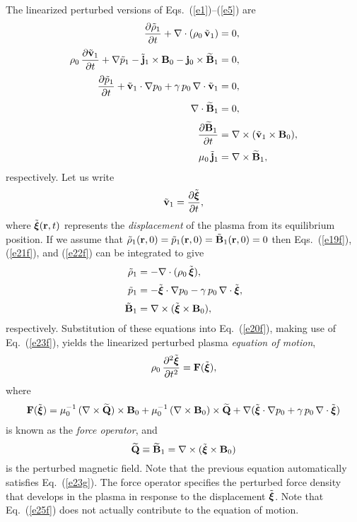 \documentclass[12pt,prb,aps,notitlepage]{revtex4-1}
\newcommand{\bxi}{\mbox{\boldmath$\xi$}}
\begin{document}
The linearized perturbed versions of  Eqs.~(\ref{e1})--(\ref{e5}) are
\begin{align}
\frac{\partial\tilde{\rho}_1}{\partial t} + \nabla\cdot(\rho_0\,\tilde{\bf v}_1) & =0,\label{e19f}\\[0.5ex]
\rho_0\,\frac{\partial\tilde{\bf v}_1}{\partial t} +\nabla \tilde{p}_1 - \tilde{\bf j}_1\times {\bf B}_0-{\bf j}_0\times \widetilde{\bf B}_1&=0,\label{e20f}\\[0.5ex]
\frac{\partial \tilde{p}_1}{\partial t}+\tilde{\bf v}_1\cdot\nabla p_0 + \gamma\,p_0\,\nabla\cdot\tilde{\bf v}_1 &=0,\label{e21f}\\[0.5ex]
\nabla\cdot\widetilde{\bf B}_1&=0,\label{e23g}\\[0.5ex]
\frac{\partial \widetilde{\bf B}_1}{\partial t} &= \nabla\times(\tilde{\bf v}_1\times {\bf B}_0),\label{e22f}\\[0.5ex]
\mu_0\,\tilde{\bf j}_1 &= \nabla\times \widetilde{\bf B}_1,\label{e23f}
\end{align}
respectively. 
Let us write
\begin{equation}\label{e15x}
\tilde{\bf v}_1 = \frac{\partial\tilde{\bxi}}{\partial t},
\end{equation}
where $\tilde{\bxi}({\bf r},t)$ represents the {\em displacement}\/ of the plasma from its equilibrium position. If
we assume that $\tilde{\rho}_1({\bf r},0)= \tilde{p}_1({\bf r},0)=\tilde{\bf B}_1({\bf r},0) = 0$ then Eqs.~(\ref{e19f}), (\ref{e21f}),
and (\ref{e22f}) can be integrated to give
\begin{align}
\tilde{\rho}_1&= -\nabla\cdot(\rho_0\,\tilde{\bxi}),\label{e25f}\\[0.5ex]
\tilde{p}_1&= -\tilde{\bxi}\cdot\nabla p_0 -\gamma\,p_0\,\nabla\cdot\tilde{\bxi},\label{e26f}\\[0.5ex]
\tilde{\bf B}_1&= \nabla\times (\tilde{\bxi}\times {\bf B}_0),
\end{align}
respectively. 
Substitution of these equations into Eq.~(\ref{e20f}), making use of Eq.~(\ref{e23f}),  yields the linearized perturbed plasma {\em equation of motion},
\begin{equation}\label{e28f}
\rho_0\,\frac{\partial^2\tilde{\bxi}}{\partial t^2} = {\bf F}(\tilde{\bxi}),
\end{equation}
where 
\begin{align}
{\bf F}(\tilde{\bxi}) = \mu_0^{-1}\,(\nabla\times \widetilde{\bf Q})\times{\bf B}_0+ \mu_0^{-1}\, (\nabla\times {\bf B}_0)\times \widetilde{\bf Q} + 
\nabla(\tilde{\bxi}\cdot \nabla p_0 + \gamma\,p_0\,\nabla\cdot\tilde{\bxi})
\end{align}
is known as the {\em force operator}, 
and
\begin{equation}
\widetilde{\bf Q}\equiv  \widetilde{\bf B}_1= \nabla\times (\tilde{\bxi}\times {\bf B}_0)
\end{equation}
is the perturbed magnetic field. Note that the previous equation automatically satisfies Eq.~(\ref{e23g}). 
 The force operator specifies the perturbed force density that develops in the plasma in
response to the displacement $\tilde{\bxi}$. Note that Eq.~(\ref{e25f}) does not actually contribute to the equation of motion. 
\end{document}
